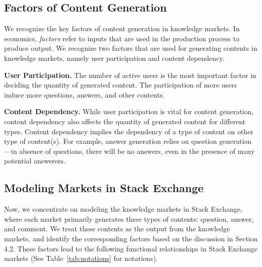 \subsection{Factors of Content Generation} 
We recognize the key factors of content generation in knowledge markets. In economics, \emph{factors} refer to inputs that are used in the production process to produce output. We recognize two factors that are used for generating contents in knowledge markets, namely user participation and content dependency.

\textbf{User Participation.} The number of active users is the most important factor in deciding the quantity of generated content. The participation of more users induce more questions, answers, and other contents.

\textbf{Content Dependency.} While user participation is vital for content generation, content dependency also affects the quantity of generated content for different types. Content dependency implies the dependency of a type of content on other type of content(s). For example, answer generation relies on question generation---in absence of questions, there will be no answers, even in the presence of many potential answerers. 

\subsection{Modeling Markets in Stack Exchange}
Now, we concentrate on modeling the knowledge markets in Stack Exchange, where each market primarily generates three types of contents: question, answer, and comment. We treat these contents as the output from the knowledge markets, and identify the corresponding factors based on the discussion in Section 4.2. These factors lead to the following functional relationships in Stack Exchange markets (See Table~\ref{tab:notations} for notations).


